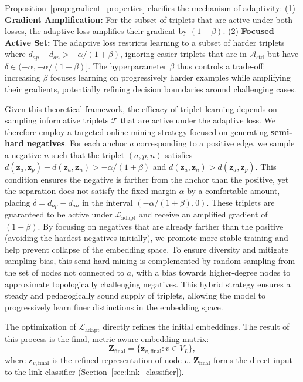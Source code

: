 \documentclass[pdflatex,sn-mathphys-num]{sn-jnl}%
\theoremstyle{thmstyleone}%
\theoremstyle{thmstyletwo}%
\theoremstyle{thmstylethree}%
\theoremstyle{plain} %
\theoremstyle{definition} %
\theoremstyle{remark} %
\theoremstyle{plain} %
\begin{document}
Proposition~\ref{prop:gradient_properties} clarifies the mechanism of adaptivity: 
(1) \textbf{Gradient Amplification:} For the subset of triplets that are active under both losses, the adaptive loss amplifies their gradient by $(1+\beta)$. 
(2) \textbf{Focused Active Set:} The adaptive loss restricts learning to a subset of harder triplets where $d_{ap} - d_{an} > -\alpha/(1+\beta)$, ignoring easier triplets that are in $\mathcal{A}_{\text{std}}$ but have $\delta \in (-\alpha, -\alpha/(1+\beta)]$. The hyperparameter $\beta$ thus controls a trade-off: increasing $\beta$ focuses learning on progressively harder examples while amplifying their gradients, potentially refining decision boundaries around challenging cases.

Given this theoretical framework, the efficacy of triplet learning depends on sampling informative triplets $\mathcal{T}$ that are active under the adaptive loss. We therefore employ a targeted online mining strategy focused on generating \textbf{semi-hard negatives}. For each anchor $a$ corresponding to a positive edge, we sample a negative $n$ such that the triplet $(a, p, n)$ satisfies $d(\mathbf{z}_a, \mathbf{z}_p) - d(\mathbf{z}_a, \mathbf{z}_n) > -\alpha/(1+\beta)$ and $d(\mathbf{z}_a, \mathbf{z}_n) > d(\mathbf{z}_a, \mathbf{z}_p)$. This condition ensures the negative is farther from the anchor than the positive, yet the separation does not satisfy the fixed margin $\alpha$ by a comfortable amount, placing $\delta = d_{ap} - d_{an}$ in the interval $(-\alpha/(1+\beta), 0)$. These triplets are guaranteed to be active under $\mathcal{L}_{\text{adapt}}$ and receive an amplified gradient of $(1+\beta)$. By focusing on negatives that are already farther than the positive (avoiding the hardest negatives initially), we promote more stable training and help prevent collapse of the embedding space. To ensure diversity and mitigate sampling bias, this semi-hard mining is complemented by random sampling from the set of nodes not connected to $a$, with a bias towards higher-degree nodes to approximate topologically challenging negatives. This hybrid strategy ensures a steady and pedagogically sound supply of triplets, allowing the model to progressively learn finer distinctions in the embedding space.

The optimization of $\mathcal{L}_{\text{adapt}}$ directly refines the initial embeddings. The result of this process is the final, metric-aware embedding matrix:
\begin{equation}
    \mathbf{Z}_{\text{final}} = \{ \mathbf{z}_{v, \text{final}} : v \in V_L \},
\end{equation}
where $\mathbf{z}_{v, \text{final}}$ is the refined representation of node $v$. $\mathbf{Z}_{\text{final}}$ forms the direct input to the link classifier (Section~\ref{sec:link_classifier}).
\end{document}
